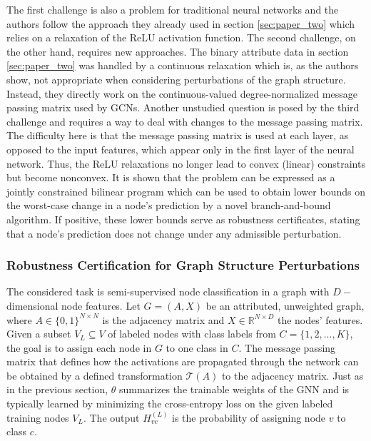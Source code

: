 \documentclass[a4paper,preprint]{sig-alternate}
\begin{document}
The first challenge is also a problem for traditional neural networks and the authors follow the approach they already used
in section \ref{sec:paper_two} which relies on a relaxation of the ReLU activation function.
The second challenge, on the other hand, requires new approaches. 
The binary attribute data in section \ref{sec:paper_two} was handled by a continuous relaxation which is, as the authors show,
not appropriate when considering perturbations of the graph structure. Instead, they directly work on the 
continuous-valued degree-normalized message passing matrix used by GCNs.
Another unstudied question is posed by the third challenge and requires a way to deal with changes to the message passing matrix.
The difficulty here is that the message passing matrix is used at each layer, as opposed to the input features,
which appear only in the first layer of the neural network. Thus, the ReLU relaxations no longer lead to convex (linear)
constraints but become nonconvex. It is shown that the problem can be expressed as a jointly constrained bilinear program
which can be used to obtain lower bounds on the worst-case change in a node's prediction by a novel branch-and-bound algorithm.
If positive, these lower bounds serve as robustness certificates, stating that a node's prediction does not change under any 
admissible perturbation.

\subsubsection{Robustness Certification for Graph Structure Perturbations}

The considered task is semi-supervised node classification in a graph with $D-$dimensional
node features. Let $G = (A, X)$ be an attributed, unweighted graph, where $A \in \{0, 1\}^{N \times N}$ is the
adjacency matrix and $X \in \mathbb{R}^{N \times D}$ the nodes' features. Given a subset $V_L \subseteq V$ of 
labeled nodes with class labels from $C = \{1, 2, ..., K\}$, the goal is to assign each node in $G$ to one class in $C$.
The message passing matrix that defines how the activations are propagated through the network can be obtained
by a defined transformation $\mathcal{T}(A)$ to the adjacency matrix. Just as in the previous section, $\theta$ summarizes the trainable weights of 
the GNN and is typically learned by minimizing the cross-entropy loss on the given labeled training nodes $V_L$. The output 
$H_{vc}^{(L)}$ is the probability of assigning node $v$ to class $c$.\newline
\end{document}
